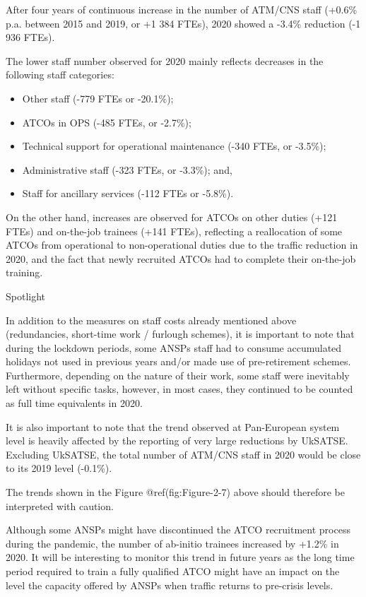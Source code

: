 \documentclass[
]{book}
\providecommand{\tightlist}{%
  \setlength{\itemsep}{0pt}\setlength{\parskip}{0pt}}
\begin{document}
After four years of continuous increase in the number of ATM/CNS staff
(+0.6\% p.a. between 2015 and 2019, or +1 384 FTEs), 2020 showed a
-3.4\% reduction (-1 936 FTEs).

The lower staff number observed for 2020 mainly reflects decreases in
the following staff categories:

\begin{itemize}
\tightlist
\item
  Other staff (-779 FTEs or -20.1\%);
\item
  ATCOs in OPS (-485 FTEs, or -2.7\%);
\item
  Technical support for operational maintenance (-340 FTEs, or -3.5\%);
\item
  Administrative staff (-323 FTEs, or -3.3\%); and,
\item
  Staff for ancillary services (-112 FTEs or -5.8\%).
\end{itemize}

On the other hand, increases are observed for ATCOs on other duties
(+121 FTEs) and on-the-job trainees (+141 FTEs), reflecting a
reallocation of some ATCOs from operational to non-operational duties
due to the traffic reduction in 2020, and the fact that newly recruited
ATCOs had to complete their on-the-job training.

Spotlight

In addition to the measures on staff costs already mentioned above
(redundancies, short-time work / furlough schemes), it is important to
note that during the lockdown periods, some ANSPs staff had to consume
accumulated holidays not used in previous years and/or made use of
pre-retirement schemes. Furthermore, depending on the nature of their
work, some staff were inevitably left without specific tasks, however,
in most cases, they continued to be counted as full time equivalents in
2020.

It is also important to note that the trend observed at Pan-European
system level is heavily affected by the reporting of very large
reductions by UkSATSE. Excluding UkSATSE, the total number of ATM/CNS
staff in 2020 would be close to its 2019 level (-0.1\%).

The trends shown in the Figure @ref(fig:Figure-2-7) above should
therefore be interpreted with caution.

Although some ANSPs might have discontinued the ATCO recruitment process
during the pandemic, the number of ab-initio trainees increased by
+1.2\% in 2020. It will be interesting to monitor this trend in future
years as the long time period required to train a fully qualified ATCO
might have an impact on the level the capacity offered by ANSPs when
traffic returns to pre-crisis levels.
\end{document}
